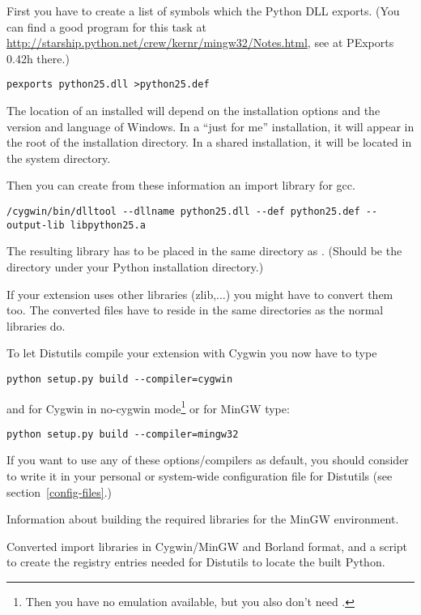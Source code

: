 \documentclass{howto}
\begin{document}
First you have to create a list of symbols which the Python DLL exports.
(You can find a good program for this task at 
\url{http://starship.python.net/crew/kernr/mingw32/Notes.html}, see at 
PExports 0.42h there.)

\begin{verbatim}
pexports python25.dll >python25.def
\end{verbatim}

The location of an installed  will depend on the
installation options and the version and language of Windows.  In a
``just for me'' installation, it will appear in the root of the
installation directory.  In a shared installation, it will be located
in the system directory.

Then you can create from these information an import library for gcc.
 
\begin{verbatim}
/cygwin/bin/dlltool --dllname python25.dll --def python25.def --output-lib libpython25.a
\end{verbatim}

The resulting library has to be placed in the same directory as 
. (Should be the  directory under your
Python installation directory.)

If your extension uses other libraries (zlib,...) you might 
have to convert them too.
The converted files have to reside in the same directories as the normal
libraries do.

To let Distutils compile your extension with Cygwin you now have to type

\begin{verbatim}
python setup.py build --compiler=cygwin
\end{verbatim}

and for Cygwin in no-cygwin mode\footnote{Then you have no
\POSIX{} emulation available, but you also don't need
.} or for MinGW type:
 
\begin{verbatim}
python setup.py build --compiler=mingw32
\end{verbatim}

If you want to use any of these options/compilers as default, you should
consider to write it in your personal or system-wide configuration file
for Distutils (see section~\ref{config-files}.)

\begin{seealso}
    {Information about building the required libraries for the MinGW
     environment.}

    {Converted import libraries in Cygwin/MinGW and Borland format,
     and a script to create the registry entries needed for Distutils
     to locate the built Python.}
\end{seealso}
\end{document}
